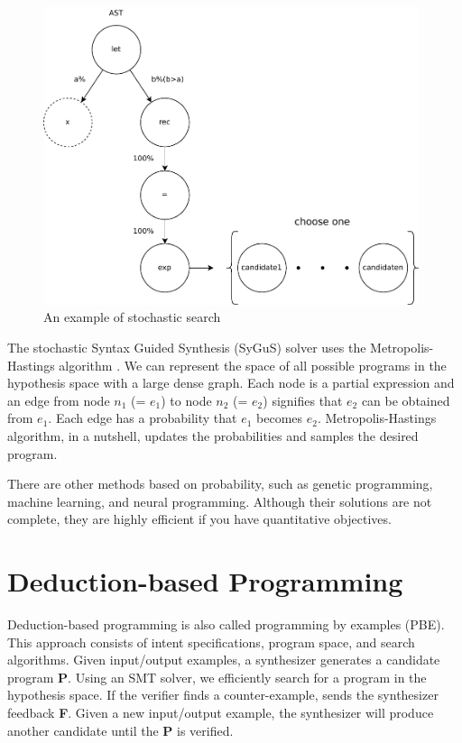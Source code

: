 \documentclass[12pt, a4paper, titlepage]{report}
\begin{document}
    \begin{figure}[htbp]
      \centering
      \includegraphics[width=11cm]{images/stochastic.pdf}
      \caption{An example of stochastic search}
      \label{stochastic}
    \end{figure}

    The stochastic Syntax Guided Synthesis (SyGuS) solver uses the Metropolis-Hastings algorithm \cite{alur:2013}.
    We can represent the space of all possible programs in the hypothesis space with a large dense graph.
    Each node is a partial expression and an edge from node $n_1$ (= $e_1$) to node $n_2$ (= $e_2$) signifies that $e_2$ can be obtained from $e_1$.
    Each edge has a probability that $e_1$ becomes $e_2$.
    Metropolis-Hastings algorithm, in a nutshell, updates the probabilities and samples the desired program.

    There are other methods based on probability, such as genetic programming, machine learning, and neural programming.
    Although their solutions are not complete, they are highly efficient if you have quantitative objectives.

  \section{Deduction-based Programming}
    Deduction-based programming is also called programming by examples (PBE).
    This approach consists of intent specifications, program space, and search algorithms.
    Given input/output examples, a synthesizer generates a candidate program \textbf{P}.
    Using an SMT solver, we efficiently search for a program in the hypothesis space.
    If the verifier finds a counter-example, sends the synthesizer feedback \textbf{F}.
    Given a new input/output example, the synthesizer will produce another candidate until the \textbf{P} is verified.
\end{document}
